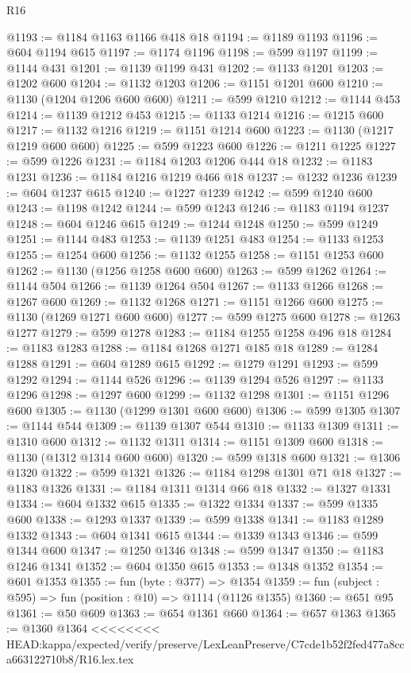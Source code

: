 \begin{lexlean}{R16}
\begin{coremodule}
{{{{{{{{{{{{{{{{{@1193 := @1184 @1163 @1166 @418 @18
@1194 := @1189 @1193
@1196 := @604 @1194 @615
@1197 := @1174 @1196
@1198 := @599 @1197
@1199 := @1144 @431
@1201 := @1139 @1199 @431
@1202 := @1133 @1201
@1203 := @1202 @600
@1204 := @1132 @1203
@1206 := @1151 @1201 @600
@1210 := @1130 (@1204 @1206 @600 @600)
@1211 := @599 @1210
@1212 := @1144 @453
@1214 := @1139 @1212 @453
@1215 := @1133 @1214
@1216 := @1215 @600
@1217 := @1132 @1216
@1219 := @1151 @1214 @600
@1223 := @1130 (@1217 @1219 @600 @600)
@1225 := @599 @1223 @600
@1226 := @1211 @1225
@1227 := @599 @1226
@1231 := @1184 @1203 @1206 @444 @18
@1232 := @1183 @1231
@1236 := @1184 @1216 @1219 @466 @18
@1237 := @1232 @1236
@1239 := @604 @1237 @615
@1240 := @1227 @1239
@1242 := @599 @1240 @600
@1243 := @1198 @1242
@1244 := @599 @1243
@1246 := @1183 @1194 @1237
@1248 := @604 @1246 @615
@1249 := @1244 @1248
@1250 := @599 @1249
@1251 := @1144 @483
@1253 := @1139 @1251 @483
@1254 := @1133 @1253
@1255 := @1254 @600
@1256 := @1132 @1255
@1258 := @1151 @1253 @600
@1262 := @1130 (@1256 @1258 @600 @600)
@1263 := @599 @1262
@1264 := @1144 @504
@1266 := @1139 @1264 @504
@1267 := @1133 @1266
@1268 := @1267 @600
@1269 := @1132 @1268
@1271 := @1151 @1266 @600
@1275 := @1130 (@1269 @1271 @600 @600)
@1277 := @599 @1275 @600
@1278 := @1263 @1277
@1279 := @599 @1278
@1283 := @1184 @1255 @1258 @496 @18
@1284 := @1183 @1283
@1288 := @1184 @1268 @1271 @185 @18
@1289 := @1284 @1288
@1291 := @604 @1289 @615
@1292 := @1279 @1291
@1293 := @599 @1292
@1294 := @1144 @526
@1296 := @1139 @1294 @526
@1297 := @1133 @1296
@1298 := @1297 @600
@1299 := @1132 @1298
@1301 := @1151 @1296 @600
@1305 := @1130 (@1299 @1301 @600 @600)
@1306 := @599 @1305
@1307 := @1144 @544
@1309 := @1139 @1307 @544
@1310 := @1133 @1309
@1311 := @1310 @600
@1312 := @1132 @1311
@1314 := @1151 @1309 @600
@1318 := @1130 (@1312 @1314 @600 @600)
@1320 := @599 @1318 @600
@1321 := @1306 @1320
@1322 := @599 @1321
@1326 := @1184 @1298 @1301 @71 @18
@1327 := @1183 @1326
@1331 := @1184 @1311 @1314 @66 @18
@1332 := @1327 @1331
@1334 := @604 @1332 @615
@1335 := @1322 @1334
@1337 := @599 @1335 @600
@1338 := @1293 @1337
@1339 := @599 @1338
@1341 := @1183 @1289 @1332
@1343 := @604 @1341 @615
@1344 := @1339 @1343
@1346 := @599 @1344 @600
@1347 := @1250 @1346
@1348 := @599 @1347
@1350 := @1183 @1246 @1341
@1352 := @604 @1350 @615
@1353 := @1348 @1352
@1354 := @601 @1353
@1355 := fun (byte : @377) => @1354
@1359 := fun (subject : @595) => fun (position : @10) => @1114 (@1126 @1355)
@1360 := @651 @95
@1361 := @50 @609
@1363 := @654 @1361 @660
@1364 := @657 @1363
@1365 := @1360 @1364
<<<<<<<< HEAD:kappa/expected/verify/preserve/LexLeanPreserve/C7cde1b52f2fed477a8cca663122710b8/R16.lex.tex
}}}}}}}}}}}}}}}}}
\end{coremodule}
\end{lexlean}
